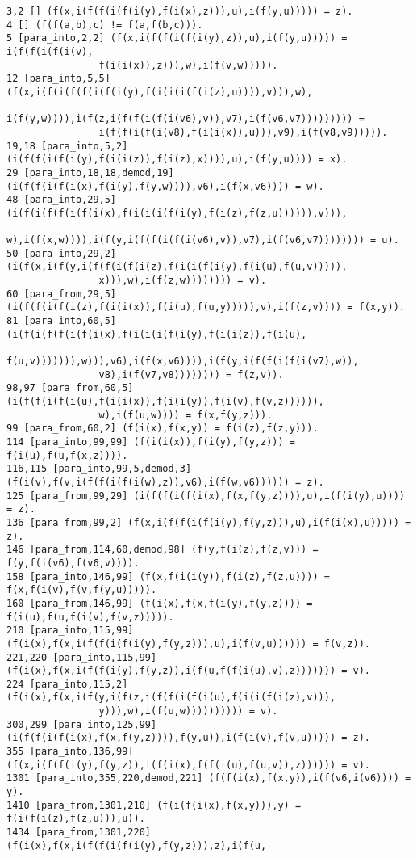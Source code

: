 {\begin{verbatim}
3,2 [] (f(x,i(f(f(i(f(i(y),f(i(x),z))),u),i(f(y,u))))) = z).
4 [] (f(f(a,b),c) != f(a,f(b,c))).
5 [para_into,2,2] (f(x,i(f(f(i(f(i(y),z)),u),i(f(y,u))))) = i(f(f(i(f(i(v),
                f(i(i(x)),z))),w),i(f(v,w))))).
12 [para_into,5,5] (f(x,i(f(i(f(f(i(f(i(y),f(i(i(i(f(i(z),u)))),v))),w),
                i(f(y,w)))),i(f(z,i(f(f(i(f(i(v6),v)),v7),i(f(v6,v7))))))))) = 
                i(f(f(i(f(i(v8),f(i(i(x)),u))),v9),i(f(v8,v9))))).
19,18 [para_into,5,2] (i(f(f(i(f(i(y),f(i(i(z)),f(i(z),x)))),u),i(f(y,u)))) = x).
29 [para_into,18,18,demod,19] (i(f(f(i(f(i(x),f(i(y),f(y,w)))),v6),i(f(x,v6)))) = w).
48 [para_into,29,5] (i(f(i(f(f(i(f(i(x),f(i(i(i(f(i(y),f(i(z),f(z,u)))))),v))),
                w),i(f(x,w)))),i(f(y,i(f(f(i(f(i(v6),v)),v7),i(f(v6,v7)))))))) = u).
50 [para_into,29,2] (i(f(x,i(f(y,i(f(f(i(f(i(z),f(i(i(f(i(y),f(i(u),f(u,v))))),
                x))),w),i(f(z,w)))))))) = v).
60 [para_from,29,5] (i(f(f(i(f(i(z),f(i(i(x)),f(i(u),f(u,y))))),v),i(f(z,v)))) = f(x,y)).
81 [para_into,60,5] (i(f(i(f(f(i(f(i(x),f(i(i(i(f(i(y),f(i(i(z)),f(i(u),
                f(u,v))))))),w))),v6),i(f(x,v6)))),i(f(y,i(f(f(i(f(i(v7),w)),
                v8),i(f(v7,v8)))))))) = f(z,v)).
98,97 [para_from,60,5] (i(f(f(i(f(i(u),f(i(i(x)),f(i(i(y)),f(i(v),f(v,z)))))),
                w),i(f(u,w)))) = f(x,f(y,z))).
99 [para_from,60,2] (f(i(x),f(x,y)) = f(i(z),f(z,y))).
114 [para_into,99,99] (f(i(i(x)),f(i(y),f(y,z))) = f(i(u),f(u,f(x,z)))).
116,115 [para_into,99,5,demod,3] (f(i(v),f(v,i(f(f(i(f(i(w),z)),v6),i(f(w,v6)))))) = z).
125 [para_from,99,29] (i(f(f(i(f(i(x),f(x,f(y,z)))),u),i(f(i(y),u)))) = z).
136 [para_from,99,2] (f(x,i(f(f(i(f(i(y),f(y,z))),u),i(f(i(x),u))))) = z).
146 [para_from,114,60,demod,98] (f(y,f(i(z),f(z,v))) = f(y,f(i(v6),f(v6,v)))).
158 [para_into,146,99] (f(x,f(i(i(y)),f(i(z),f(z,u)))) = f(x,f(i(v),f(v,f(y,u))))).
160 [para_from,146,99] (f(i(x),f(x,f(i(y),f(y,z)))) = f(i(u),f(u,f(i(v),f(v,z))))).
210 [para_into,115,99] (f(i(x),f(x,i(f(f(i(f(i(y),f(y,z))),u),i(f(v,u)))))) = f(v,z)).
221,220 [para_into,115,99] (f(i(x),f(x,i(f(f(i(y),f(y,z)),i(f(u,f(f(i(u),v),z))))))) = v).
224 [para_into,115,2] (f(i(x),f(x,i(f(y,i(f(z,i(f(f(i(f(i(u),f(i(i(f(i(z),v))),
                y))),w),i(f(u,w)))))))))) = v).
300,299 [para_into,125,99] (i(f(f(i(f(i(x),f(x,f(y,z)))),f(y,u)),i(f(i(v),f(v,u))))) = z).
355 [para_into,136,99] (f(x,i(f(f(i(y),f(y,z)),i(f(i(x),f(f(i(u),f(u,v)),z)))))) = v).
1301 [para_into,355,220,demod,221] (f(f(i(x),f(x,y)),i(f(v6,i(v6)))) = y).
1410 [para_from,1301,210] (f(i(f(i(x),f(x,y))),y) = f(i(f(i(z),f(z,u))),u)).
1434 [para_from,1301,220] (f(i(x),f(x,i(f(f(i(f(i(y),f(y,z))),z),i(f(u,

\end{verbatim}}
